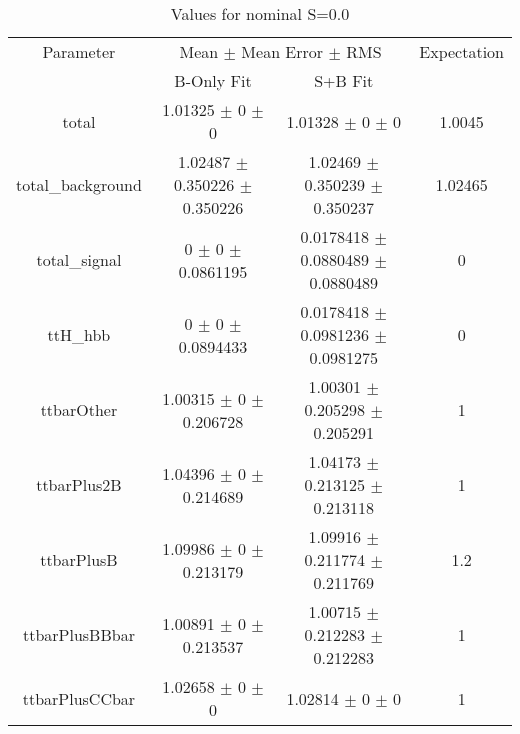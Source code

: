 \begin{table}
\centering
\caption{Values for nominal S=0.0}
\begin{tabular}{cccc}
\toprule
Parameter & \multicolumn{2}{c}{Mean $\pm$ Mean Error $\pm$ RMS} & Expectation\\
 & B-Only Fit & S+B Fit & \\
\midrule
total & \num{1.01325} $\pm$ \num{0} $\pm$ \num{0} & \num{1.01328} $\pm$ \num{0} $\pm$ \num{0} & \num{1.0045}\\
total\_background & \num{1.02487} $\pm$ \num{0.350226} $\pm$ \num{0.350226} & \num{1.02469} $\pm$ \num{0.350239} $\pm$ \num{0.350237} & \num{1.02465}\\
total\_signal & \num{0} $\pm$ \num{0} $\pm$ \num{0.0861195} & \num{0.0178418} $\pm$ \num{0.0880489} $\pm$ \num{0.0880489} & \num{0}\\
ttH\_hbb & \num{0} $\pm$ \num{0} $\pm$ \num{0.0894433} & \num{0.0178418} $\pm$ \num{0.0981236} $\pm$ \num{0.0981275} & \num{0}\\
ttbarOther & \num{1.00315} $\pm$ \num{0} $\pm$ \num{0.206728} & \num{1.00301} $\pm$ \num{0.205298} $\pm$ \num{0.205291} & \num{1}\\
ttbarPlus2B & \num{1.04396} $\pm$ \num{0} $\pm$ \num{0.214689} & \num{1.04173} $\pm$ \num{0.213125} $\pm$ \num{0.213118} & \num{1}\\
ttbarPlusB & \num{1.09986} $\pm$ \num{0} $\pm$ \num{0.213179} & \num{1.09916} $\pm$ \num{0.211774} $\pm$ \num{0.211769} & \num{1.2}\\
ttbarPlusBBbar & \num{1.00891} $\pm$ \num{0} $\pm$ \num{0.213537} & \num{1.00715} $\pm$ \num{0.212283} $\pm$ \num{0.212283} & \num{1}\\
ttbarPlusCCbar & \num{1.02658} $\pm$ \num{0} $\pm$ \num{0} & \num{1.02814} $\pm$ \num{0} $\pm$ \num{0} & \num{1}\\
\bottomrule
\end{tabular}
\end{table}